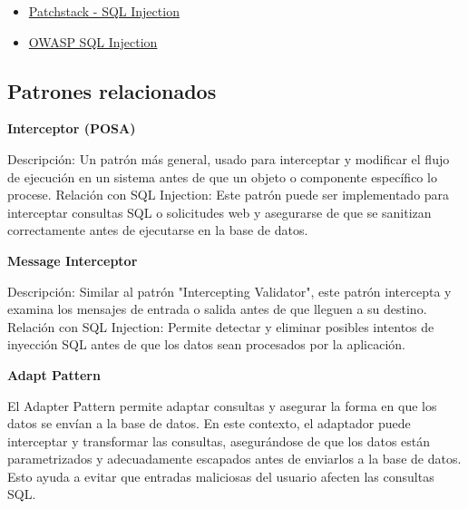 \begin{itemize}
    \item \href{https://patchstack.com/academy/wordpress/vulnerabilities/sql-injection/}{Patchstack - SQL Injection}
    \item \href{https://cheatsheetseries.owasp.org/cheatsheets/SQL\_Injection\_Prevention\_Cheat\_Sheet.html}{OWASP SQL Injection}
\end{itemize}

\subsection*{Patrones relacionados}

\textbf{Interceptor (POSA)} 

Descripción: Un patrón más general, usado para interceptar y modificar el flujo de ejecución en un sistema antes de que un objeto o componente específico lo procese.
Relación con SQL Injection: Este patrón puede ser implementado para interceptar consultas SQL o solicitudes web y asegurarse de que se sanitizan correctamente antes de ejecutarse en la base de datos.

\textbf{Message Interceptor}

Descripción: Similar al patrón "Intercepting Validator", este patrón intercepta y examina los mensajes de entrada o salida antes de que lleguen a su destino.
Relación con SQL Injection: Permite detectar y eliminar posibles intentos de inyección SQL antes de que los datos sean procesados por la aplicación.

\textbf{Adapt Pattern}

El Adapter Pattern permite adaptar consultas y asegurar la forma en que los datos se envían a la base de datos. En este contexto, el adaptador puede interceptar y transformar las consultas, asegurándose de que los datos están parametrizados y adecuadamente escapados antes de enviarlos a la base de datos. Esto ayuda a evitar que entradas maliciosas del usuario afecten las consultas SQL.
